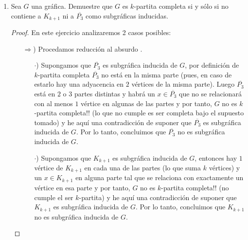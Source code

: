 \documentclass{article}
\begin{document}
\begin{enumerate}
\begin{proof}
    \textcolor{blue}{Caso 2:} Si $G$ es un \'arbol, esto nos indica que $G$ es
    $1-$conexa, y es por eso que se considera este caso como el m\'inimo para el
    que se cumplir\'a la condici\'on a demostrar. Sabemos por el teorema de
    caracterizaci\'on de \'arboles que cada arista en $G$ ser\'a un puente, y
    por el resultado previamente mostrado sabemos que existe una trayectoria $T$
    en $G$ de orden exactamente $3$, as\'i $T$ es claramente $P_3$ y concluimos
    $P_3$ es subg\'afica inducida de $G$.

    De los casos anteriores concluimos que el enunciado es verdadero.
  \end{proof}

\item {} Sea $G$ una gr\'afica. Demuestre que $G$
  es $k$-partita completa si y s\'olo si no contiene a $K_{k+1}$ ni a $\overline{P_3}$
  como subgr\'aficas inducidas.

  \begin{proof}
    En este ejercicio analizaremos 2 casos posibles:

    \begin{itemize}
    \item[$\Rightarrow$)] Procedamos reducción al absurdo .

      \begin{itemize}
      \item[$\cdot$)] Supongamos que $\overline{P_3}$ es subgr\'afica inducida
        de $G$, por definición de $k$-partita completa $\overline{P_3}$ no está
        en la misma parte (pues, en caso de estarlo hay una adyacencia en $2$
        vértices de la misma parte). Luego $\overline{P_3}$ está en $2$ o $3$
        partes distintas y habrá un $x \in \overline{P_3}$ que no se relacionará
        con al menos $1$ vértice en algunas de las partes y por tanto, $G$ no es
        $k$-partita completa!! (lo que no cumple es ser completa bajo el supuesto
        tomado) y he aquí una contradicción de suponer que $\overline{P_3}$ es
        subgr\'afica inducida de $G$. Por lo tanto, concluimos que $\overline{P_3}$
        no es subgr\'afica inducida de $G$.

      \item[$\cdot$)] Supongamos que $K_{k + 1}$ es subgr\'afica inducida de $G$,
        entonces hay $1$ vértice de $K_{k + 1}$ en cada una de las partes (lo que
        suma $k$ v\'ertices) y un $x \in K_{k + 1}$ en alguna parte tal que se
        relaciona con exactamente un v\'ertice en esa parte y por tanto, $G$ no
        es $k$-partita completa!! (no cumple el ser $k$-partita) y he aquí una
        contradicción de suponer que $K_{k + 1}$ es subgr\'afica inducida de $G$.
        Por lo tanto, concluimos que $K_{k + 1}$ no es subgr\'afica inducida de $G$.


\end{itemize}
\end{itemize}
\end{proof}
\end{enumerate}
\end{document}

